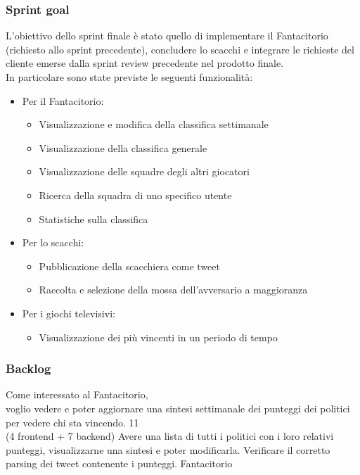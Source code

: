 \subsubsection{Sprint goal}
L'obiettivo dello sprint finale è stato quello di implementare il Fantacitorio (richiesto allo sprint precedente), concludere lo scacchi e 
integrare le richieste del cliente emerse dalla sprint review precedente nel prodotto finale.\\
In particolare sono state previste le seguenti funzionalità:
\begin{itemize}
    \item Per il Fantacitorio:
    \begin{itemize}
        \item Visualizzazione e modifica della classifica settimanale
        \item Visualizzazione della classifica generale
        \item Visualizzazione delle squadre degli altri giocatori
        \item Ricerca della squadra di uno specifico utente
        \item Statistiche sulla classifica
    \end{itemize}
    \item Per lo scacchi:
    \begin{itemize}
        \item Pubblicazione della scacchiera come tweet
        \item Raccolta e selezione della mossa dell'avversario a maggioranza
    \end{itemize}
    \item Per i giochi televisivi:
    \begin{itemize}
        \item Visualizzazione dei più vincenti in un periodo di tempo
    \end{itemize}
\end{itemize}


\subsubsection{Backlog}
\userstory%
{Come interessato al Fantacitorio,\\voglio vedere e poter aggiornare una sintesi settimanale dei punteggi dei politici\\per vedere chi sta vincendo.}%
{11\\(4 frontend + 7 backend)}%
{Avere una lista di tutti i politici con i loro relativi punteggi, visualizzarne una sintesi e poter modificarla.}%
{Verificare il corretto parsing dei tweet contenente i punteggi.}
{Fantacitorio}

